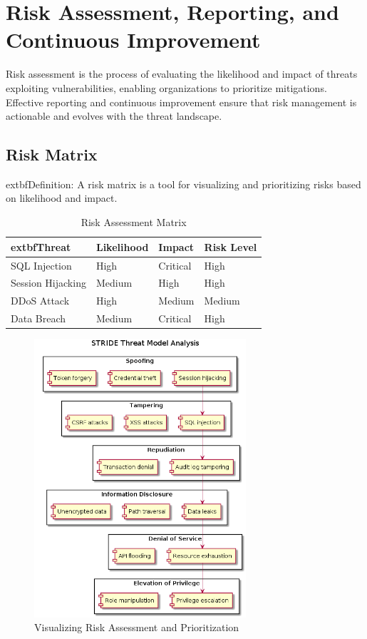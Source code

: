 
\section*{Risk Assessment, Reporting, and Continuous Improvement}
Risk assessment is the process of evaluating the likelihood and impact of threats exploiting vulnerabilities, enabling organizations to prioritize mitigations\cite{uceda2015,nist800154}. Effective reporting and continuous improvement ensure that risk management is actionable and evolves with the threat landscape.

\subsection*{Risk Matrix}
	extbf{Definition:} A risk matrix is a tool for visualizing and prioritizing risks based on likelihood and impact\cite{nist800154}.
\begin{table}[H]
\centering
\begin{tabular}{|l|l|l|l|}
\hline
	extbf{Threat} & \textbf{Likelihood} & \textbf{Impact} & \textbf{Risk Level} \\
\hline
SQL Injection & High & Critical & High \\
Session Hijacking & Medium & High & High \\
DDoS Attack & High & Medium & Medium \\
Data Breach & Medium & Critical & High \\
\hline
\end{tabular}
\caption{Risk Assessment Matrix\cite{uceda2015,nist800154}}
\end{table}

\begin{figure}[H]
	\centering
	\includegraphics[width=0.7\textwidth]{images/stride-analysis}
	\caption{Visualizing Risk Assessment and Prioritization}
\end{figure}

